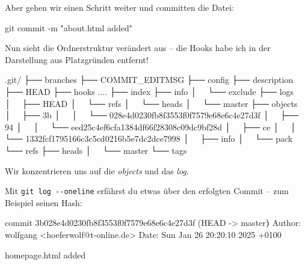 \documentclass[
  letterpaper,
  DIV=11]{scrreprt}
\newenvironment{Shaded}{\begin{snugshade}}{\end{snugshade}}
\newcommand{\AttributeTok}[1]{\textcolor[rgb]{0.40,0.45,0.13}{#1}}
\newcommand{\ErrorTok}[1]{\textcolor[rgb]{0.68,0.00,0.00}{#1}}
\newcommand{\ExtensionTok}[1]{\textcolor[rgb]{0.00,0.23,0.31}{#1}}
\newcommand{\FunctionTok}[1]{\textcolor[rgb]{0.28,0.35,0.67}{#1}}
\newcommand{\KeywordTok}[1]{\textcolor[rgb]{0.00,0.23,0.31}{\textbf{#1}}}
\newcommand{\NormalTok}[1]{\textcolor[rgb]{0.00,0.23,0.31}{#1}}
\newcommand{\OperatorTok}[1]{\textcolor[rgb]{0.37,0.37,0.37}{#1}}
\newcommand{\StringTok}[1]{\textcolor[rgb]{0.13,0.47,0.30}{#1}}
\begin{document}
Aber gehen wir einen Schritt weiter und committen die Datei:

\begin{Shaded}
\begin{Highlighting}[]
\FunctionTok{git}\NormalTok{ commit }\AttributeTok{{-}m} \StringTok{"about.html added"}
\end{Highlighting}
\end{Shaded}

Nun sieht die Ordnerstruktur verändert aus -- die Hooks habe ich in der
Darstellung aus Platzgründen entfernt!

\begin{Shaded}
\begin{Highlighting}[]
\ExtensionTok{.git/}
\ExtensionTok{├──}\NormalTok{ branches}
\ExtensionTok{├──}\NormalTok{ COMMIT\_EDITMSG}
\ExtensionTok{├──}\NormalTok{ config}
\ExtensionTok{├──}\NormalTok{ description}
\ExtensionTok{├──}\NormalTok{ HEAD}
\ExtensionTok{├──}\NormalTok{ hooks}
    \ExtensionTok{....}
\ExtensionTok{├──}\NormalTok{ index}
\ExtensionTok{├──}\NormalTok{ info}
\ExtensionTok{│  }\NormalTok{ └── exclude}
\ExtensionTok{├──}\NormalTok{ logs}
\ExtensionTok{│  }\NormalTok{ ├── HEAD}
\ExtensionTok{│  }\NormalTok{ └── refs}
\ExtensionTok{│  }\NormalTok{     └── heads}
\ExtensionTok{│  }\NormalTok{         └── master}
\ExtensionTok{├──}\NormalTok{ objects}
\ExtensionTok{│  }\NormalTok{ ├── 3b  }
\ExtensionTok{│  }\NormalTok{ │   └── 028e4d0230fb8f3553f0f7579e68e6c4e27d3f}
\ExtensionTok{│  }\NormalTok{ ├── 94}
\ExtensionTok{│  }\NormalTok{ │   └── eed25c4ef6cfa1384df66f28308c09dc9bf28d}
\ExtensionTok{│  }\NormalTok{ ├── ce}
\ExtensionTok{│  }\NormalTok{ │   └── 1332fcf1795166c3c5cd0216b5e7dc2dce7998}
\ExtensionTok{│  }\NormalTok{ ├── info}
\ExtensionTok{│  }\NormalTok{ └── pack}
\ExtensionTok{└──}\NormalTok{ refs}
    \ExtensionTok{├──}\NormalTok{ heads}
    \ExtensionTok{│  }\NormalTok{ └── master}
    \ExtensionTok{└──}\NormalTok{ tags}
\end{Highlighting}
\end{Shaded}

Wir konzentrieren uns auf die \emph{objects} und das \emph{log}.

Mit \texttt{git\ log\ -\/-oneline} erfährst du etwas über den erfolgten
Commit -- zum Beispiel seinen Hash:

\begin{Shaded}
\begin{Highlighting}[]
\ExtensionTok{commit}\NormalTok{ 3b028e4d0230fb8f3553f0f7579e68e6c4e27d3f }\ErrorTok{(}\ExtensionTok{HEAD} \AttributeTok{{-}}\OperatorTok{\textgreater{}}\NormalTok{ master}\KeywordTok{)}
\ExtensionTok{Author:}\NormalTok{ wolfgang }\OperatorTok{\textless{}}\NormalTok{hoeferwolf@t{-}online.de}\OperatorTok{\textgreater{}}
\ExtensionTok{Date:}\NormalTok{   Sun Jan 26 20:20:10 2025 +0100}

    \ExtensionTok{homepage.html}\NormalTok{ added}
\end{Highlighting}
\end{Shaded}
\end{document}
